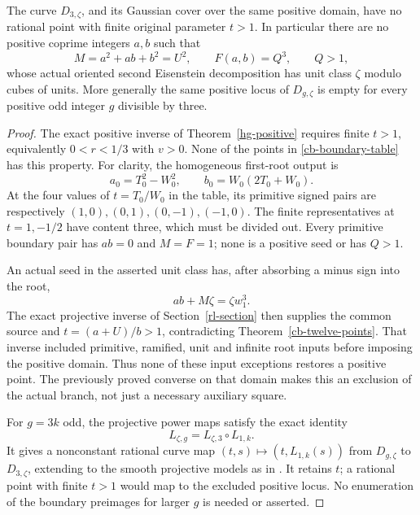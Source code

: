 \begin{corollary}
\label{cb-positive-empty}
The curve \(D_{3,\zeta}\), and its Gaussian cover over the same
positive domain, have no rational point with finite original
parameter \(t>1\). In particular there are no positive coprime
integers \(a,b\) such that
\[
 M=a^2+ab+b^2=U^2,\qquad F(a,b)=Q^3,\qquad Q>1,
\]
whose actual oriented second Eisenstein decomposition has unit class
\(\zeta\) modulo cubes of units. More generally the same positive
locus of \(D_{g,\zeta}\) is empty for every positive odd integer
\(g\) divisible by three.
\end{corollary}
\begin{proof}
The exact positive inverse of Theorem~\ref{hg-positive} requires
finite \(t>1\), equivalently \(0<r<1/3\) with \(v>0\).
None of the points in \eqref{cb-boundary-table} has this property.
For clarity, the homogeneous first-root output is
\[
 a_0=T_0^2-W_0^2,\qquad b_0=W_0(2T_0+W_0).
\]
At the four values of \(t=T_0/W_0\) in the table, its primitive
signed pairs are respectively
\((1,0),(0,1),(0,-1),(-1,0)\). The finite representatives at
\(t=1,-1/2\) have content three, which must be divided out.
Every primitive boundary pair has \(ab=0\) and \(M=F=1\);
none is a positive seed or has \(Q>1\).

An actual seed in the asserted unit class has, after absorbing a
minus sign into the root,
\[
 ab+M\zeta=\zeta w_1^3.
\]
The exact projective inverse of Section~\ref{rl-section} then
supplies the common source and \(t=(a+U)/b>1\), contradicting
Theorem~\ref{cb-twelve-points}. That inverse included primitive,
ramified, unit and infinite root inputs before imposing the positive
domain. Thus none of these input exceptions restores a positive
point. The previously proved converse on that domain makes this an
exclusion of the actual branch, not just a necessary auxiliary square.

For \(g=3k\) odd, the projective power maps satisfy the exact
identity
\[
 L_{\zeta,g}=L_{\zeta,3}\circ L_{1,k}.
\]
It gives a nonconstant rational curve map
\((t,s)\mapsto(t,L_{1,k}(s))\) from \(D_{g,\zeta}\) to
\(D_{3,\zeta}\), extending to the smooth projective models as in
\cite[Lemmas~53.2.2 and 53.2.6]{StacksCurves2026}.
It retains \(t\); a rational point with finite \(t>1\) would map
to the excluded positive locus. No enumeration of the boundary
preimages for larger \(g\) is needed or asserted.
\end{proof}

